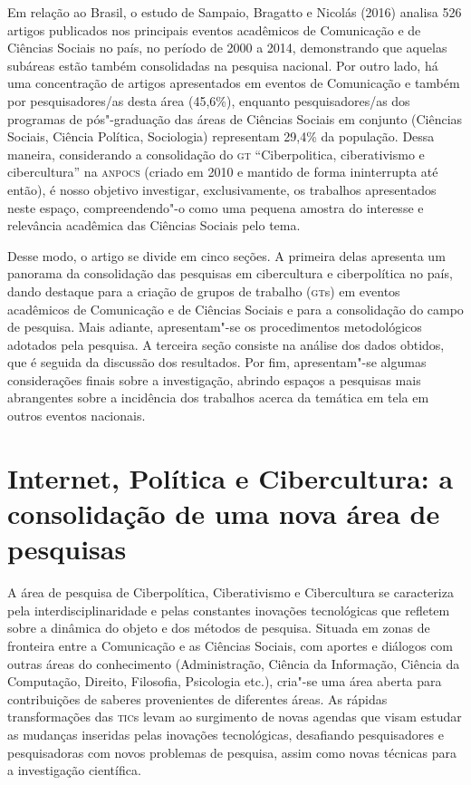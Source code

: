 Em relação ao Brasil, o estudo de Sampaio, Bragatto e Nicolás (2016)
analisa 526 artigos publicados nos principais eventos acadêmicos de
Comunicação e de Ciências Sociais no país, no período de 2000 a 2014,
demonstrando que aquelas subáreas estão também consolidadas na pesquisa
nacional. Por outro lado, há uma concentração de artigos apresentados em
eventos de Comunicação e também por pesquisadores/as desta área
(45,6\%), enquanto pesquisadores/as dos programas de pós"-graduação das
áreas de Ciências Sociais em conjunto (Ciências Sociais, Ciência
Política, Sociologia) representam 29,4\% da população. Dessa maneira,
considerando a consolidação do \textsc{gt} ``Ciberpolitica, ciberativismo e
cibercultura'' na \textsc{anpocs} (criado em 2010 e mantido de forma ininterrupta
até então), é nosso objetivo investigar, exclusivamente, os trabalhos
apresentados neste espaço, compreendendo"-o como uma pequena amostra do
interesse e relevância acadêmica das Ciências Sociais pelo tema.

Desse modo, o artigo se divide em cinco seções. A primeira delas
apresenta um panorama da consolidação das pesquisas em cibercultura e
ciberpolítica no país, dando destaque para a criação de grupos de
trabalho (\textsc{gt}s) em eventos acadêmicos de Comunicação e de Ciências
Sociais e para a consolidação do campo de pesquisa. Mais adiante,
apresentam"-se os procedimentos metodológicos adotados pela pesquisa. A
terceira seção consiste na análise dos dados obtidos, que é seguida da
discussão dos resultados. Por fim, apresentam"-se algumas considerações
finais sobre a investigação, abrindo espaços a pesquisas mais
abrangentes sobre a incidência dos trabalhos acerca da temática em tela
em outros eventos nacionais.

\section{Internet, Política e Cibercultura: a consolidação de uma nova área de pesquisas}

A área de pesquisa de Ciberpolítica, Ciberativismo e Cibercultura se
caracteriza pela interdisciplinaridade e pelas constantes inovações
tecnológicas que refletem sobre a dinâmica do objeto e dos métodos de
pesquisa. Situada em zonas de fronteira entre a Comunicação e as
Ciências Sociais, com aportes e diálogos com outras áreas do
conhecimento (Administração, Ciência da Informação, Ciência da
Computação, Direito, Filosofia, Psicologia etc.), cria"-se uma área
aberta para contribuições de saberes provenientes de diferentes áreas.
As rápidas transformações das \textsc{tic}s levam ao surgimento de novas agendas
que visam estudar as mudanças inseridas pelas inovações tecnológicas,
desafiando pesquisadores e pesquisadoras com novos problemas de
pesquisa, assim como novas técnicas para a investigação científica.

